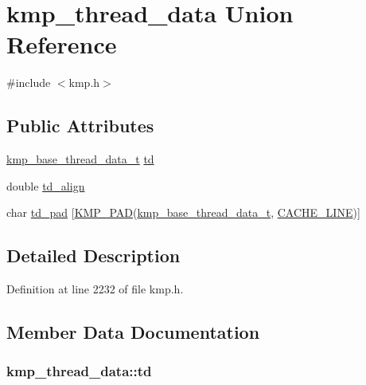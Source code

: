 \hypertarget{unionkmp__thread__data}{\section{kmp\-\_\-thread\-\_\-data Union Reference}
\label{unionkmp__thread__data}
}


{\ttfamily \#include $<$kmp.\-h$>$}

\subsection*{Public Attributes}
\begin{DoxyCompactItemize}
\item 
\hyperlink{kmp_8h_a4f204ee9ce0088affd5c86e3171243ba}{kmp\-\_\-base\-\_\-thread\-\_\-data\-\_\-t} \hyperlink{unionkmp__thread__data_ab77eb99d95f4c71c3175e4f08ae56375}{td}
\item 
double \hyperlink{unionkmp__thread__data_a827df3ddfdd40df4ed9f3c5f01cd88c8}{td\-\_\-align}
\item 
char \hyperlink{unionkmp__thread__data_a3a2d79e5de9017bc88ce99870eeaad55}{td\-\_\-pad} \mbox{[}\hyperlink{kmp__lock_8h_a7e782410115489f45ab1686c39a2bb89}{K\-M\-P\-\_\-\-P\-A\-D}(\hyperlink{kmp_8h_a4f204ee9ce0088affd5c86e3171243ba}{kmp\-\_\-base\-\_\-thread\-\_\-data\-\_\-t}, \hyperlink{kmp__os_8h_a86194c659a2d795e5f5949d293ae4661}{C\-A\-C\-H\-E\-\_\-\-L\-I\-N\-E})\mbox{]}
\end{DoxyCompactItemize}


\subsection{Detailed Description}


Definition at line 2232 of file kmp.\-h.



\subsection{Member Data Documentation}
\hypertarget{unionkmp__thread__data_ab77eb99d95f4c71c3175e4f08ae56375}{
\subsubsection[{td}]{ kmp\-\_\-thread\-\_\-data\-::td}}\label{unionkmp__thread__data_ab77eb99d95f4c71c3175e4f08ae56375}


